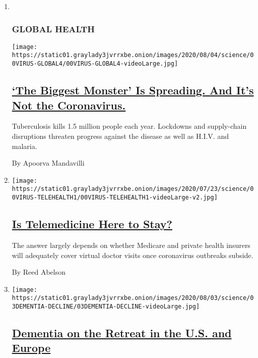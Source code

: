 \begin{enumerate}
\def\labelenumi{\arabic{enumi}.}
\item ~
  \hypertarget{global-health}{%
  \subsubsection{GLOBAL HEALTH}\label{global-health}}

  \texttt{[image: https://static01.graylady3jvrrxbe.onion/images/2020/08/04/science/00VIRUS-GLOBAL4/00VIRUS-GLOBAL4-videoLarge.jpg]}

  \hypertarget{the-biggest-monster-is-spreading-and-its-not-the-coronavirus}{%
  \subsection{\texorpdfstring{\href{/2020/08/03/health/coronavirus-tuberculosis-aids-malaria.html}{`The
  Biggest Monster' Is Spreading. And It's Not the
  Coronavirus.}}{`The Biggest Monster' Is Spreading. And It's Not the Coronavirus.}}\label{the-biggest-monster-is-spreading-and-its-not-the-coronavirus}}

  Tuberculosis kills 1.5 million people each year. Lockdowns and
  supply-chain disruptions threaten progress against the disease as well
  as H.I.V. and malaria.

  By Apoorva Mandavilli
\item
  \texttt{[image: https://static01.graylady3jvrrxbe.onion/images/2020/07/23/science/00VIRUS-TELEHEALTH1/00VIRUS-TELEHEALTH1-videoLarge-v2.jpg]}

  \hypertarget{is-telemedicine-here-to-stay}{%
  \subsection{\texorpdfstring{\href{/2020/08/03/health/covid-telemedicine-congress.html}{Is
  Telemedicine Here to
  Stay?}}{Is Telemedicine Here to Stay?}}\label{is-telemedicine-here-to-stay}}

  The answer largely depends on whether Medicare and private health
  insurers will adequately cover virtual doctor visits once coronavirus
  outbreaks subside.

  By Reed Abelson
\item
  \texttt{[image: https://static01.graylady3jvrrxbe.onion/images/2020/08/03/science/03DEMENTIA-DECLINE/03DEMENTIA-DECLINE-videoLarge.jpg]}

  \hypertarget{dementia-on-the-retreat-in-the-us-and-europe}{%
  \subsection{\texorpdfstring{\href{/2020/08/03/health/alzheimers-dementia-rates.html}{Dementia
  on the Retreat in the U.S. and
  Europe}}{Dementia on the Retreat in the U.S. and Europe}}\label{dementia-on-the-retreat-in-the-us-and-europe}}


\end{enumerate}

